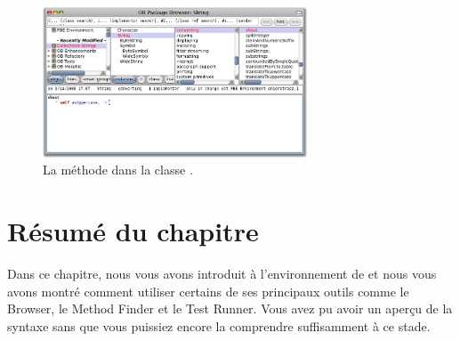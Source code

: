 \documentclass[a4paper,10pt,twoside]{book}
\begin{document}
\begin{figure}[hbt]
	{\centerline{\includegraphics[width=0.7\textwidth]{String-Shout}}}
\caption{La méthode  dans la classe \mbox{.}}
\end{figure}

\section{Résumé du chapitre}
Dans ce chapitre, nous vous avons introduit à l'environnement de
\pharo et nous vous avons montré comment utiliser certains de ses
principaux outils comme le   Browser, le
Method Finder et le Test Runner. Vous avez pu avoir un aperçu de la
syntaxe sans que vous puissiez encore la comprendre suffisamment à ce stade.
\end{document}
